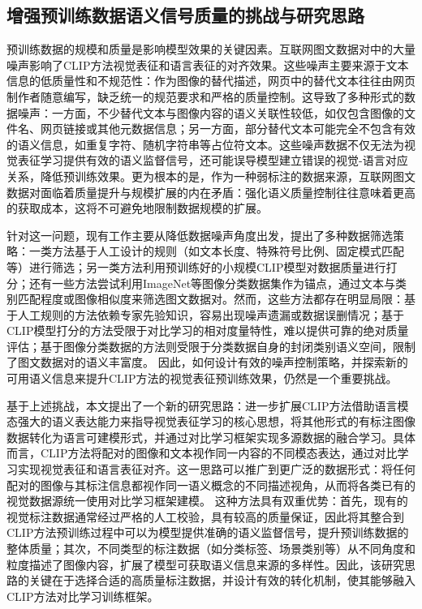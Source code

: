 \subsection{增强预训练数据语义信号质量的挑战与研究思路}
预训练数据的规模和质量是影响模型效果的关键因素。互联网图文数据对中的大量噪声影响了CLIP方法视觉表征和语言表征的对齐效果。这些噪声主要来源于文本信息的低质量性和不规范性：作为图像的替代描述，网页中的替代文本往往由网页制作者随意编写，缺乏统一的规范要求和严格的质量控制。这导致了多种形式的数据噪声：一方面，不少替代文本与图像内容的语义关联性较低，如仅包含图像的文件名、网页链接或其他元数据信息；另一方面，部分替代文本可能完全不包含有效的语义信息，如重复字符、随机字符串等占位符文本。这些噪声数据不仅无法为视觉表征学习提供有效的语义监督信号，还可能误导模型建立错误的视觉-语言对应关系，降低预训练效果。更为根本的是，作为一种弱标注的数据来源，互联网图文数据对面临着质量提升与规模扩展的内在矛盾：强化语义质量控制往往意味着更高的获取成本，这将不可避免地限制数据规模的扩展。

针对这一问题，现有工作主要从降低数据噪声角度出发，提出了多种数据筛选策略：一类方法基于人工设计的规则（如文本长度、特殊符号比例、固定模式匹配等）进行筛选；另一类方法利用预训练好的小规模CLIP模型对数据质量进行打分；还有一些方法尝试利用ImageNet等图像分类数据集作为锚点，通过文本与类别匹配程度或图像相似度来筛选图文数据对。然而，这些方法都存在明显局限：基于人工规则的方法依赖专家先验知识，容易出现噪声遗漏或数据误删情况；基于CLIP模型打分的方法受限于对比学习的相对度量特性，难以提供可靠的绝对质量评估；基于图像分类数据的方法则受限于分类数据自身的封闭类别语义空间，限制了图文数据对的语义丰富度。
因此，如何设计有效的噪声控制策略，并探索新的可用语义信息来提升CLIP方法的视觉表征预训练效果，仍然是一个重要挑战。

基于上述挑战，本文提出了一个新的研究思路：进一步扩展CLIP方法借助语言模态强大的语义表达能力来指导视觉表征学习的核心思想，将其他形式的有标注图像数据转化为语言可建模形式，并通过对比学习框架实现多源数据的融合学习。具体而言，CLIP方法将配对的图像和文本视作同一内容的不同模态表达，通过对比学习实现视觉表征和语言表征对齐。这一思路可以推广到更广泛的数据形式：将任何配对的图像与其标注信息都视作同一语义概念的不同描述视角，从而将各类已有的视觉数据源统一使用对比学习框架建模。
这种方法具有双重优势：首先，现有的视觉标注数据通常经过严格的人工校验，具有较高的质量保证，因此将其整合到CLIP方法预训练过程中可以为模型提供准确的语义监督信号，提升预训练数据的整体质量；其次，不同类型的标注数据（如分类标签、场景类别等）从不同角度和粒度描述了图像内容，扩展了模型可获取语义信息来源的多样性。因此，该研究思路的关键在于选择合适的高质量标注数据，并设计有效的转化机制，使其能够融入CLIP方法对比学习训练框架。


